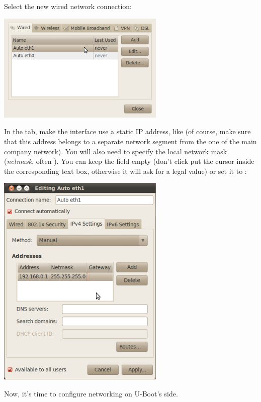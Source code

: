 Select the new wired network connection:

\begin{center}
\includegraphics[width=8cm]{labs/kernel-board-setup/network-config-2.png}
\end{center}

In the  tab, make the interface use a static IP
address, like  (of course, make sure that this address
belongs to a separate network segment from the one of the main company
network). You will also need to specify the local network mask
(\emph{netmask}, often ). You can keep the
 field empty (don't click put the cursor inside the
corresponding text box, otherwise it will ask for a legal value)
or set it to :

\begin{center}
\includegraphics[width=8cm]{labs/kernel-board-setup/network-config-3.png}
\end{center}

Now, it's time to configure networking on U-Boot's side.

